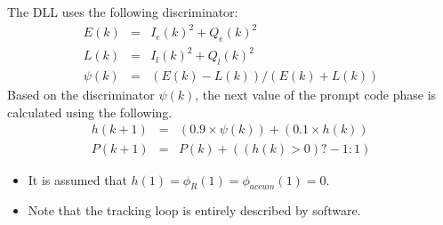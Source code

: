 The DLL uses the following discriminator:
\begin{eqnarray*}
E(k) & = & I_e(k)^2 + Q_e(k)^2\\
L(k) & = & I_l(k)^2 + Q_l(k)^2\\
\psi(k) & =  & (E(k) - L(k))/(E(k) + L(k)) 
\end{eqnarray*}
Based on the discriminator $\psi(k)$, the 
next value of the prompt code phase is calculated
using the following.
\begin{eqnarray*}
h(k+1) & = & (0.9 \times \psi(k)) + (0.1 \times h(k)) \\
P(k+1) & = & P(k) + ((h(k) > 0) ? -1 : 1)
\end{eqnarray*}

\vspace{1cm}
\begin{itemize}
\item It is assumed that $h(1) =\phi_R(1) = \phi_{accum}(1) = 0$.
\item Note that the tracking loop is entirely described by
software.
\end{itemize}

